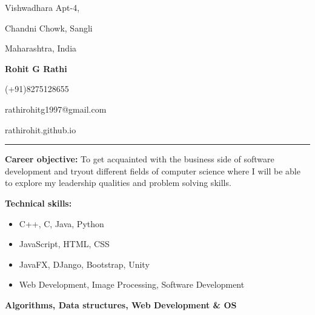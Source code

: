 \documentclass[11pt]{article}
\begin{document}
	\begin{center}
		\begin{minipage}[b]{0.33333\textwidth}
			\raggedright
			Vishwadhara Apt-4,\par
			Chandni Chowk, Sangli\par
			Maharashtra, India
		\end{minipage}%
		\begin{minipage}[b]{0.33333\textwidth}
			\centering
			\begin{huge}
				\textbf{Rohit G Rathi}
			\end{huge}
		\end{minipage}%
		\begin{minipage}[b]{0.33333\textwidth}
			\raggedleft
			(+91)8275128655\par
			rathirohitg1997@gmail.com\par
			rathirohit.github.io\par
		\end{minipage}%
		\bigskip
		\hrule
		\vspace{0.5cm}
		\begin{minipage}[t]{1\textwidth}
			\raggedright\smallskip
			\begin{LARGE}
				\textbf{Career objective:}\medskip\linebreak%
				{\small To get acquainted with the business side of software development and tryout different fields of computer science where I will be able to explore my leadership qualities and problem solving skills.}\linebreak%
			\end{LARGE}
		\end{minipage}%
		\vspace{0.3cm}
		\begin{minipage}[t]{0.35\textwidth}
			\raggedright\smallskip
			\begin{LARGE}
				\textbf{Technical skills:}\medskip%
				{\small
					\begin{itemize}
						\item C++, C, Java, Python
						\item JavaScript, HTML, CSS
						\item JavaFX, DJango, Bootstrap, Unity
						\item Web Development, Image Processing, Software Development
					\end{itemize}
				}
				\small \textbf{Algorithms, Data structures, Web Development \& OS}
			\end{LARGE}
			\\\vspace{0.85cm}

\end{minipage}
\end{center}
\end{document}
